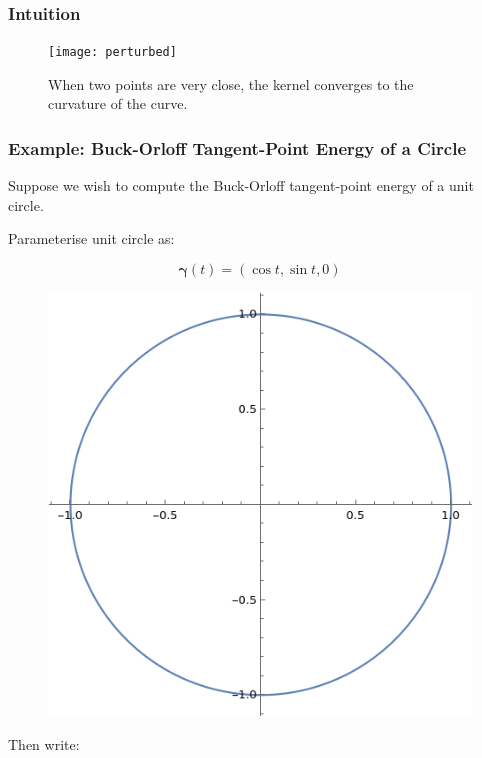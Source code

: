 \documentclass{beamer}
\theoremstyle{remark}
\newcommand{\gammabf}{\boldsymbol{\gamma}}
\begin{document}
\begin{frame}
    \frametitle{Intuition}
    \begin{figure}[h]
        \centering
        \texttt{[image: perturbed]}
        \caption{When two points are very close, the kernel converges to the curvature of the curve.}
    \end{figure}
\end{frame}

\begin{frame}
    \frametitle{Example: Buck-Orloff Tangent-Point Energy of a Circle}
    \begin{example}
        Suppose we wish to compute the Buck-Orloff tangent-point energy of a unit circle.
        {
            Parameterise unit circle as:
            \begin{multicols}{2}
            \begin{equation*}
                \gammabf (t) = \left( \cos{t}, \sin{t}, 0 \right)
            \end{equation*}
            \columnbreak
            \begin{figure}[h]
                \centering
                \includegraphics[scale=0.2]{unitcircle}
            \end{figure}
            \end{multicols}
        }
        {
            Then write:
}
\end{example}
\end{frame}
\end{document}

